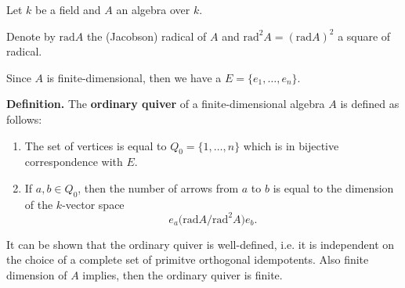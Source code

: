 \documentclass[12pt]{article}
\begin{document}
Let $k$ be a field and $A$ an algebra over $k$.

Denote by $\mathrm{rad}A$ the (Jacobson) radical of $A$ and $\mathrm{rad}^2A=(\mathrm{rad}A)^2$ a square of radical.

Since $A$ is finite-dimensional, then we have a  $E=\{e_1,\ldots,e_n\}$.

\textbf{Definition.} The \textbf{ordinary quiver} of a finite-dimensional algebra $A$ is defined as follows:
\begin{enumerate}
\item The set of vertices is equal to $Q_0=\{1,\ldots,n\}$ which is in bijective correspondence with $E$.
\item If $a,b\in Q_0$, then the number of arrows from $a$ to $b$ is equal to the dimension of the $k$-vector space
$$e_a\big(\mathrm{rad}A/\mathrm{rad}^2A\big)e_b.$$
\end{enumerate}

It can be shown that the ordinary quiver is well-defined, i.e. it is independent on the choice of a complete set of primitve orthogonal idempotents. Also finite dimension of $A$ implies, then the ordinary quiver is finite.
\end{document}
